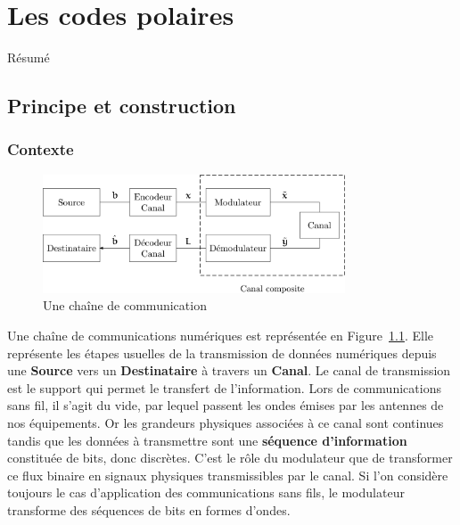 
\chapter{Les codes polaires}

Résumé

\vspace*{\fill}
\minitocTITI
\vspace*{\fill}


\section{Principe et construction}

\subsection{Contexte}



\begin{figure}[t]
\centering
\includegraphics[width=0.8\textwidth]{main/ch1_fig/chaine_com}
\caption{Une chaîne de communication}
\label{fig:chaine_com}
\end{figure}
Une chaîne de communications numériques est représentée en Figure~\ref{fig:chaine_com}.
Elle représente les étapes usuelles de la transmission de données numériques depuis une \textbf{Source} vers un \textbf{Destinataire} à travers un \textbf{Canal}.
Le canal de transmission est le support qui permet le transfert de l'information. Lors de communications sans fil, il s'agit du vide, par lequel passent les ondes émises par les antennes de nos équipements. Or les grandeurs physiques associées à ce canal sont continues tandis que les données à transmettre sont une \textbf{séquence d'information} constituée de bits, donc discrètes. C'est le rôle du modulateur que de transformer ce flux binaire en signaux physiques transmissibles par le canal. Si l'on considère toujours le cas d'application des communications sans fils, le modulateur transforme des séquences de bits en formes d'ondes.

